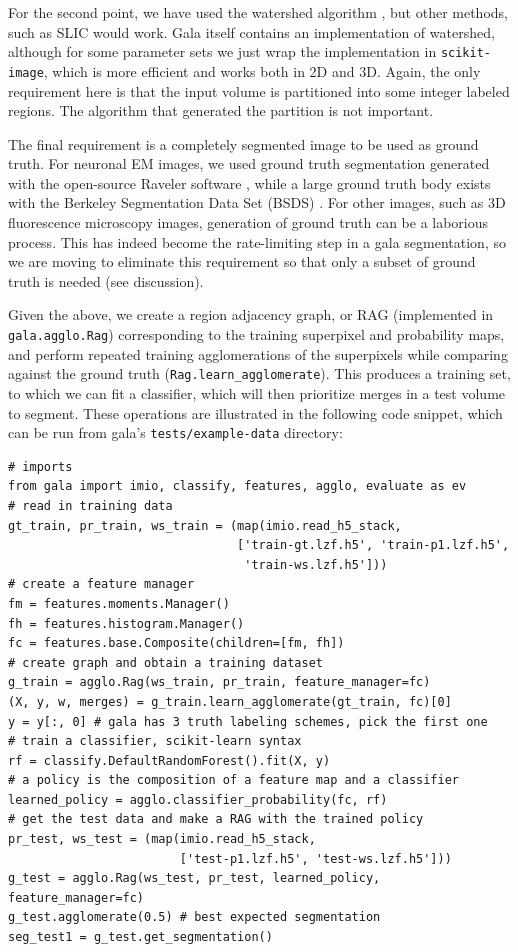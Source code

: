 \documentclass{frontiersSCNS} %
\begin{document}
For the second point, we have used the watershed algorithm \citep{Vincent:1991}, but other methods, such as SLIC \citep{Achanta:2012wc} would work.
Gala itself contains an implementation of watershed, although for some parameter sets we just wrap the implementation in \texttt{\small scikit-image}, which is more efficient and works both in 2D and 3D.
Again, the only requirement here is that the input volume is partitioned into some integer labeled regions.
The algorithm that generated the partition is not important.

The final requirement is a completely segmented image to be used as ground truth.
For neuronal EM images, we used ground truth segmentation generated with the open-source Raveler software \citep{raveler}, while a large ground truth body exists with the Berkeley Segmentation Data Set (BSDS) \citep{MartinFTM01}.
For other images, such as 3D fluorescence microscopy images, generation of ground truth can be a laborious process.
This has indeed become the rate-limiting step in a gala segmentation, so we are moving to eliminate this requirement so that only a subset of ground truth is needed (see discussion).

Given the above, we create a region adjacency graph, or RAG (implemented in \texttt{\small gala.agglo.Rag}) corresponding to the training superpixel and probability maps, and perform repeated training agglomerations of the superpixels while comparing against the ground truth (\texttt{\small Rag.learn\_agglomerate}).
This produces a training set, to which we can fit a classifier, which will then prioritize merges in a test volume to segment.
These operations are illustrated in the following code snippet, which can be run from gala's \texttt{\small tests/example-data} directory:

{\small
\begin{verbatim}
# imports
from gala import imio, classify, features, agglo, evaluate as ev
# read in training data
gt_train, pr_train, ws_train = (map(imio.read_h5_stack,
                                ['train-gt.lzf.h5', 'train-p1.lzf.h5',
                                 'train-ws.lzf.h5']))
# create a feature manager
fm = features.moments.Manager()
fh = features.histogram.Manager()
fc = features.base.Composite(children=[fm, fh])
# create graph and obtain a training dataset
g_train = agglo.Rag(ws_train, pr_train, feature_manager=fc)
(X, y, w, merges) = g_train.learn_agglomerate(gt_train, fc)[0]
y = y[:, 0] # gala has 3 truth labeling schemes, pick the first one
# train a classifier, scikit-learn syntax
rf = classify.DefaultRandomForest().fit(X, y)
# a policy is the composition of a feature map and a classifier
learned_policy = agglo.classifier_probability(fc, rf)
# get the test data and make a RAG with the trained policy
pr_test, ws_test = (map(imio.read_h5_stack,
                        ['test-p1.lzf.h5', 'test-ws.lzf.h5']))
g_test = agglo.Rag(ws_test, pr_test, learned_policy, feature_manager=fc)
g_test.agglomerate(0.5) # best expected segmentation
seg_test1 = g_test.get_segmentation()
\end{verbatim}
}
\end{document}
